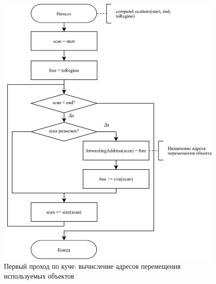 \begin{figure}[H]
	\centering
	\includegraphics[scale=0.175]{assets/mark-compact-2.png}
	\caption{Первый проход по куче: вычисление адресов перемещения используемых объектов}
	\label{fig:mark-compact-2}
\end{figure}

